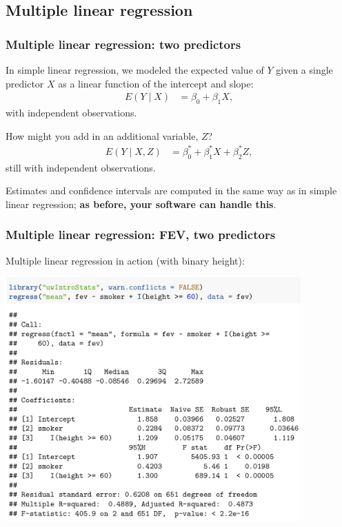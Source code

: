 \documentclass[12pt, 
hyperref={colorlinks=true, linkcolor=blue, urlcolor=cyan},dvipsnames]{beamer}
\begin{document}
\subsection{Multiple linear regression}
\begin{frame}
\frametitle{Multiple linear regression: two predictors}
In simple linear regression, we modeled the expected value of $Y$ given a single predictor $X$ as a linear function of the intercept and slope:
\begin{align*}
E(Y \mid X) &= \beta_0 + \beta_1 X,
\end{align*}
with independent observations.

How might you add in an additional variable, $Z$? \pause
\begin{align*}
E(Y \mid X, Z) &= \beta_0^* + \beta_1^* X + \beta_2^* Z,
\end{align*}
still with independent observations.

Estimates and confidence intervals are computed in the same way as in simple linear regression; \textbf{as before, your software can handle this}.
\end{frame}

\begin{frame}
\frametitle{Multiple linear regression: FEV, two predictors}
Multiple linear regression in action (with binary height): \vspace{-0.45cm}
\begin{center}
\includegraphics[width=0.85\textwidth]{plots/fev_vs_smoke_adjust_binary_height.png}
\end{center}
\end{frame}
\end{document}

